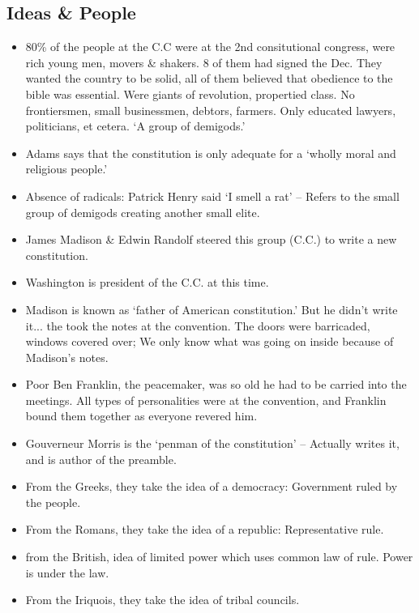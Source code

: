 \documentclass{article}
\begin{document}
  \subsection{Ideas \& People}
    \begin{itemize}
      \item 80\% of the people at the C.C were at the 2nd consitutional congress, were rich young men, movers \& shakers. 8 of them had signed the Dec. They wanted the country to be solid, all of them believed that obedience to the bible was essential. Were giants of revolution, propertied class. No frontiersmen, small businessmen, debtors, farmers. Only educated lawyers, politicians, et cetera. `A group of demigods.'
      \item Adams says that the constitution is only adequate for a `wholly moral and religious people.'
      \item Absence of radicals: Patrick Henry said `I smell a rat' -- Refers to the small group of demigods creating another small elite.
      \item James Madison \& Edwin Randolf steered this group (C.C.) to write a new constitution.
      \item Washington is president of the C.C. at this time.
      \item Madison is known as `father of American constitution.' But he didn't write it... the took the notes at the convention. The doors were barricaded, windows covered over; We only know what was going on inside because of Madison's notes. 
      \item Poor Ben Franklin, the peacemaker, was so old he had to be carried into the meetings. All types of personalities were at the convention, and Franklin bound them together as everyone revered him.
      \item Gouverneur Morris is the `penman of the constitution' -- Actually writes it, and is author of the preamble.
      \item From the Greeks, they take the idea of a democracy: Government ruled by the people.
      \item From the Romans, they take the idea of a republic: Representative rule.
      \item from the British, idea of limited power which uses common law of rule. Power is under the law.
      \item From the Iriquois, they take the idea of tribal councils.
    \end{itemize}
\end{document}
